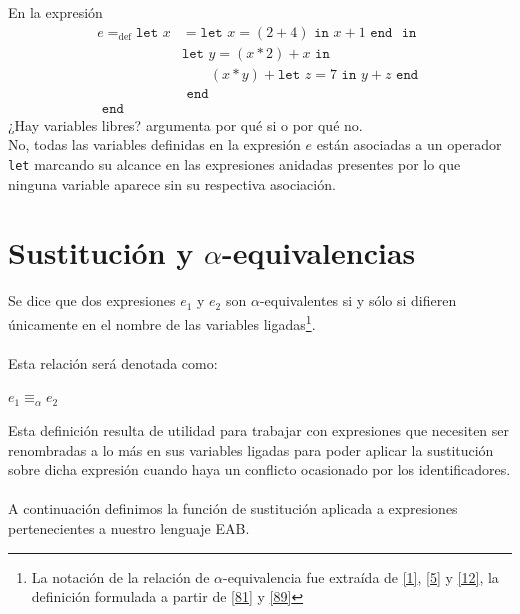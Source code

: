     \begin{exercise}
        En la expresión
	 \begin{align*}
    	e=_{\text{def}}\texttt{let  }
    		x&= \texttt{let }x = (2 + 4) \texttt{ in } x+1 \texttt{ end }
    		\texttt{ in }\\
    		 &\texttt{let }y=(x \ast 2)+x 
    		 	\texttt{ in } \\
    		 & \qquad(x\ast y) + \texttt{let }z=7 \texttt{ in } 
    		 						y+z 
    		 				\texttt{ end }\\
    		 &\texttt{ end }\\
    	\texttt{ end }&
    \end{align*}
 	¿Hay variables libres? argumenta por qué si o por qué no. \\
    
        No, todas las variables definidas en la expresión $e$ están asociadas a un operador \texttt{let} marcando su alcance en las expresiones anidadas presentes por lo que ninguna variable aparece sin su respectiva asociación.
    \end{exercise}

\section{Sustitución y $\alpha$-equivalencias}
    \begin{definition} Se dice que dos expresiones $e_1$ y $e_2$ son $\alpha$-equivalentes si y sólo si difieren únicamente en el nombre de las variables ligadas\footnote{La notación de la relación de $\alpha$-equivalencia fue extraída de \hyperlink{1}{[1]}, \hyperlink{5}{[5]} y \hyperlink{12}{[12]}, la definición formulada a partir de \hyperlink{81}{[81]} y \hyperlink{89}{[89]}}.\\\\
    Esta relación será denotada como: 
    \begin{center}
            $e_1\equiv_\alpha e_2$        
    \end{center}
    \end{definition}

    Esta definición resulta de utilidad para trabajar con expresiones que necesiten ser renombradas a lo más en sus variables ligadas para poder aplicar la sustitución sobre dicha expresión cuando haya un conflicto ocasionado por los identificadores. \\\\
    A continuación definimos la función de sustitución aplicada a expresiones pertenecientes a nuestro lenguaje \textsf{EAB}.


